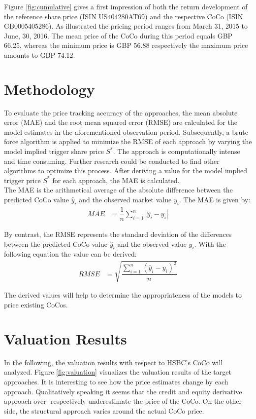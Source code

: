 Figure \ref{fig:cumulative} gives a first impression of both the return development of the reference share price (ISIN US404280AT69) and the respective CoCo (ISIN GB0005405286). As illustrated the pricing period ranges from March 31, 2015 to June, 30, 2016. The mean price of the CoCo during this period equals GBP 66.25, whereas the minimum price is GBP 56.88 respectively the maximum price amounts to GBP 74.12. 

\section{Methodology}

To evaluate the price tracking accuracy of the approaches, the mean absolute error (MAE) and the root mean squared error (RMSE) are calculated for the model estimates in the aforementioned observation period. Subsequently, a brute force algorithm is applied to minimize the RMSE of each approach by varying the model implied trigger share price $S^*$. The approach is computationally intense and time consuming. Further research could be conducted to find other algorithms to optimize this process. After deriving a value for the model implied trigger price $S^*$ for each approach, the MAE is calculated.\\  

The MAE is the arithmetical average of the absolute difference between the predicted CoCo value $\hat{y}_i$ and the observed market value $y_i$. The MAE is given by:
\begin{align}
MAE &= \dfrac{1}{n} \sum_{i=1}^{n} |\hat{y}_i - y_i | 
\end{align}

By contrast, the RMSE represents the standard deviation of the differences between the predicted CoCo value $\hat{y}_i$ and the observed value $y_i$. With the following equation the value can be derived:
\begin{align}
RMSE &= \sqrt{\dfrac{\sum_{i=1}^{n} \left( \hat{y}_i - y_i \right)^2}{n}}
\end{align}

The derived values will help to determine the appropriateness of the models to price existing CoCos.

\section{Valuation Results}

In the following, the valuation results with respect to HSBC's CoCo will analyzed. Figure \ref{fig:valuation} visualizes the valuation results of the target approaches. It is interesting to see how the price estimates change by each approach. Qualitatively speaking it seems that the credit and equity derivative approach over- respectively underestimate the price of the CoCo. On the other side, the structural approach varies around the actual CoCo price.
 
